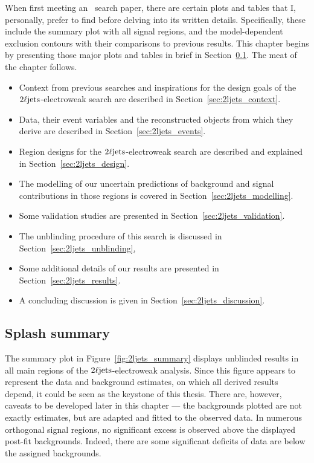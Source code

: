 When first meeting an \atlas\ search paper,
there are certain plots and tables that I, personally, prefer to find before
delving into its written details.
Specifically, these include the summary plot with all signal regions,
and the model-dependent exclusion contours with their comparisons to previous
results.
This chapter begins by presenting those major plots and tables in brief in
Section~\ref{sec:2ljets_splash}.
The meat of the chapter follows.
\begin{itemize}
\item Context from previous searches and inspirations for the design goals
of the $2\ell\mathrm{jets}$-electroweak search are described in
Section~\ref{sec:2ljets_context}.
\item Data, their event variables and the reconstructed objects from which
they derive are described in Section~\ref{sec:2ljets_events}.
\item Region designs for the $2\ell\mathrm{jets}$-electroweak search are described and
explained in Section~\ref{sec:2ljets_design}.
\item The modelling of our uncertain predictions of background and signal
contributions in those regions is covered in
Section~\ref{sec:2ljets_modelling}.
\item Some validation studies are presented in
Section~\ref{sec:2ljets_validation}.
\item The unblinding procedure of this search is discussed in
Section~\ref{sec:2ljets_unblinding},
\item Some additional details of our results are presented in
Section~\ref{sec:2ljets_results}.
\item A concluding discussion is given in
Section~\ref{sec:2ljets_discussion}.
\end{itemize}


\subsection{Splash summary}
\label{sec:2ljets_splash}
The summary plot in Figure~\ref{fig:2ljets_summary} displays unblinded results
in all main regions of the $2\ell\mathrm{jets}$-electroweak analysis.
Since this figure appears to represent the data and background estimates,
on which all derived results depend, it could be seen as the keystone of this
thesis.
There are, however, caveats to be developed later in this chapter ---
the backgrounds plotted are not exactly estimates, but are adapted and fitted
to the observed data.
In numerous orthogonal signal regions, no significant excess is observed
above the displayed post-fit backgrounds.
Indeed, there are some significant deficits of data are below the assigned
backgrounds.

